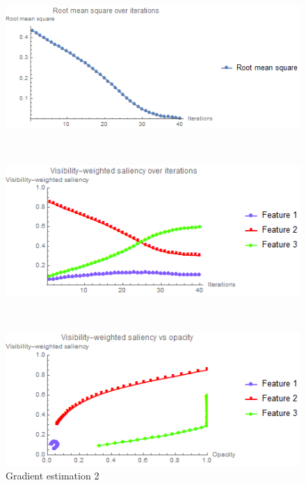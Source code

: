 \begin{figure}
	\centering
	\begin{minipage}{.33\textwidth}
		\includegraphics[width=1\linewidth]{images/nucleon_strong_red_rms_fixed}
	\end{minipage}~
	\begin{minipage}{.33\textwidth}
		\includegraphics[width=1\linewidth]{images/nucleon_strong_red_saliency_fixed}	
	\end{minipage}~
	\begin{minipage}{.33\textwidth}
		\includegraphics[width=1\linewidth]{images/nucleon_strong_red_saliencyopacity_fixed}
	\end{minipage}
	\caption{Gradient estimation 2}
	\label{fig:nucleon_strong_red_plot_fixed}
\end{figure}

